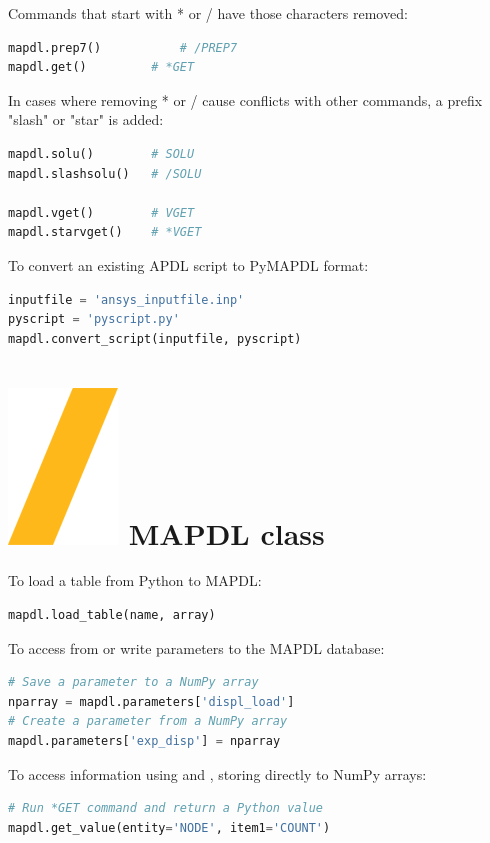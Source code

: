 \documentclass[9pt,landscape]{article}
\begin{document}
\begin{multicols}{3}
Commands that start with * or / have those characters removed:
\begin{lstlisting}[language=Python]
mapdl.prep7()	        # /PREP7
mapdl.get()	        # *GET
\end{lstlisting}

In cases where removing * or / cause conflicts with other commands, a prefix "slash" or "star" is added:
\begin{lstlisting}[language=Python]
mapdl.solu()		# SOLU
mapdl.slashsolu()	# /SOLU

mapdl.vget()		# VGET
mapdl.starvget()	# *VGET
\end{lstlisting} 

\columnbreak
To convert an existing APDL script to PyMAPDL format:
\begin{lstlisting}[language=Python]
inputfile = 'ansys_inputfile.inp'
pyscript = 'pyscript.py'
mapdl.convert_script(inputfile, pyscript)
\end{lstlisting} 

\section{\includegraphics[height=\fontcharht\font`\S]{slash.png} MAPDL class}
To load a table from Python to MAPDL:
\begin{lstlisting}[language=Python]
mapdl.load_table(name, array)
\end{lstlisting} 

To access from or write parameters to the MAPDL database:
\begin{lstlisting}[language=Python]
# Save a parameter to a NumPy array
nparray = mapdl.parameters['displ_load']
# Create a parameter from a NumPy array
mapdl.parameters['exp_disp'] = nparray
\end{lstlisting} 

To access information using  and , storing directly to NumPy arrays:
\begin{lstlisting}[language=Python]
# Run *GET command and return a Python value
mapdl.get_value(entity='NODE', item1='COUNT')


\end{lstlisting}
\end{multicols}
\end{document}
